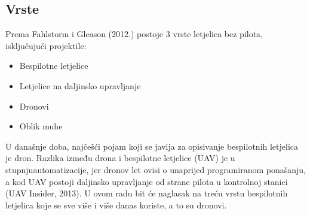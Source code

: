 \documentclass[times, utf8, diplomski]{fer}
\begin{document}
\subsection{Vrste}
Prema Fahlstorm  i  Gleason  (2012.) postoje  3  vrste  letjelica  bez  pilota,  isključujući 
projektile: \begin{itemize}
\item Bespilotne letjelice 
\item Letjelice na daljinsko upravljanje 
\item Dronovi 
\item Oblik muhe 
\end{itemize}
U današnje doba, najčešći pojam koji se javlja za opisivanje bespilotnih letjelica je dron. Razlika između drona i bespilotne letjelice (UAV) je u stupnjuautomatizacije, jer dronov let ovisi o unaprijed programiranom ponašanju, a kod UAV postoji daljinsko upravljanje od strane pilota  u  kontrolnoj  stanici (UAV  Insider,  2013). U ovom radu bit će naglasak na treću vrstu bespilotnih letjelica koje se sve više i više danas koriste, a to su dronovi. 
\end{document}
